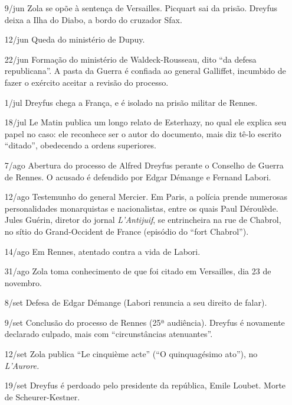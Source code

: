 \begin{itemize}
\item[9/jun] Zola se opõe à sentença de Versailles. Picquart sai da prisão.
Dreyfus deixa a Ilha do Diabo, a bordo do cruzador Sfax.

\item[12/jun] Queda do ministério de Dupuy.

\item[22/jun] Formação do ministério de Waldeck-Rousseau, dito ``da defesa
republicana''. A pasta da Guerra é confiada ao general Galliffet, incumbido de
fazer o exército aceitar a revisão do processo.

\item[1/jul] Dreyfus chega a França, e é isolado na prisão militar de Rennes.

\item[18/jul] Le Matin publica um longo relato de Esterhazy, no qual ele
explica seu papel no caso: ele reconhece ser o autor do documento, mais diz
tê-lo escrito ``ditado'', obedecendo a ordens superiores.
 
\item[7/ago] Abertura do processo de Alfred Dreyfus perante o Conselho de
Guerra de Rennes. O acusado é defendido por Edgar Démange e Fernand Labori.

\item[12/ago] Testemunho do general Mercier. Em Paris, a polícia prende
numerosas personalidades monarquistas e nacionalistas, entre os quais Paul
Déroulède. Jules Guérin, diretor do jornal \textit{L'Antijuif}, se entrincheira
na rue de Chabrol, no sítio do Grand-Occident de France (episódio do ``fort
Chabrol'').

\item[14/ago] Em Rennes, atentado contra a vida de Labori.

\item[31/ago] Zola toma conhecimento de que foi citado em Versailles, dia 23 de
novembro.

\item[8/set] Defesa de Edgar Démange (Labori renuncia a seu direito de falar).

\item[9/set] Conclusão do processo de Rennes (25ª audiência). Dreyfus é
novamente declarado culpado, mais com ``circunstâncias atenuantes''.

\item[12/set] Zola publica ``Le cinquième acte'' (``O quinquagésimo ato''), no
\textit{L'Aurore.}

\item[19/set] Dreyfus é perdoado pelo presidente da república, Emile Loubet.
Morte de Scheurer-Kestner.


\end{itemize}
